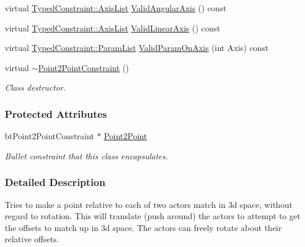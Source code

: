 \begin{DoxyCompactItemize}
virtual \hyperlink{classphys_1_1TypedConstraint_a26261a4055e84e104c58d84eea5667c2}{TypedConstraint::AxisList} \hyperlink{classphys_1_1Point2PointConstraint_ab33ef9c2b99432247b4582cb829bb9dc}{ValidAngularAxis} () const 
\item 
virtual \hyperlink{classphys_1_1TypedConstraint_a26261a4055e84e104c58d84eea5667c2}{TypedConstraint::AxisList} \hyperlink{classphys_1_1Point2PointConstraint_a7c430ecbfc798d26ddabd66ee66f6a27}{ValidLinearAxis} () const 
\item 
virtual \hyperlink{classphys_1_1TypedConstraint_a4c2dcea3fbb764e454840329126d034e}{TypedConstraint::ParamList} \hyperlink{classphys_1_1Point2PointConstraint_a5ab3a1dac5cabe07f6abfe576090634f}{ValidParamOnAxis} (int Axis) const 
\item 
virtual \hyperlink{classphys_1_1Point2PointConstraint_a6e0bdac8c6ee7612c07b441c7556dc14}{$\sim$Point2PointConstraint} ()
\begin{DoxyCompactList}\small\item\em Class destructor. \item\end{DoxyCompactList}\end{DoxyCompactItemize}
\subsubsection*{Protected Attributes}
\begin{DoxyCompactItemize}
\item 
\hypertarget{classphys_1_1Point2PointConstraint_aa58b7fd9fe368c72d5bc5e1990bdf593}{
btPoint2PointConstraint $\ast$ \hyperlink{classphys_1_1Point2PointConstraint_aa58b7fd9fe368c72d5bc5e1990bdf593}{Point2Point}}
\label{classphys_1_1Point2PointConstraint_aa58b7fd9fe368c72d5bc5e1990bdf593}

\begin{DoxyCompactList}\small\item\em Bullet constraint that this class encapsulates. \item\end{DoxyCompactList}\end{DoxyCompactItemize}


\subsubsection{Detailed Description}
Tries to make a point relative to each of two actors match in 3d space, without regard to rotation. This will translate (push around) the actors to attempt to get the offsets to match up in 3d space. The actors can freely rotate about their relative offsets. 


